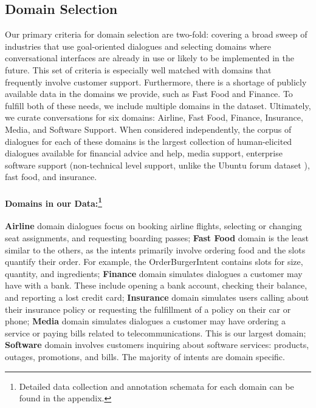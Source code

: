 \subsection{Domain Selection}
Our primary criteria for domain selection are two-fold: covering a broad sweep of industries that use goal-oriented dialogues and selecting domains where conversational interfaces are already in use or likely to be implemented in the future.  This set of criteria is especially well matched with domains that frequently involve customer support.  Furthermore, there is a shortage of publicly available  data in the domains we provide, such as Fast Food and Finance.  To fulfill both of these needs, we include multiple domains in the \multidogo dataset. Ultimately, we  curate conversations for six domains: Airline, Fast Food, Finance, Insurance, Media, and Software Support.  When considered independently, the corpus of dialogues for each of these domains is the largest collection of human-elicited dialogues available for financial advice and help, media support, enterprise software support (non-technical level support, unlike the Ubuntu forum dataset \citep{lowe2015ubuntu}), fast food, and insurance.

\paragraph{Domains in our Data:\footnote{Detailed data collection and annotation schemata for each domain can be found in the appendix.}}

\textbf{Airline} domain dialogues focus on booking airline flights, selecting or changing seat assignments, and requesting boarding passes; \textbf{Fast Food} domain is the least similar to the others, as the intents primarily involve ordering food and the slots quantify their order.  
%
For example, the OrderBurgerIntent contains slots for size, quantity, and ingredients; \textbf{Finance} domain simulates dialogues a customer may have with a bank.  
%
These include opening a bank account, checking their balance, and reporting a lost credit card; \textbf{Insurance} domain simulates users calling about their insurance policy or requesting the fulfillment of a policy on their car or phone; \textbf{Media} domain simulates dialogues a customer may have ordering a service or paying bills related to telecommunications. 
%
This is our largest domain; \textbf{Software} domain involves customers inquiring about software services: products, outages, promotions, and bills.  The majority of intents are domain specific.  

